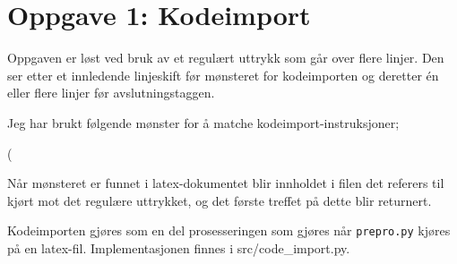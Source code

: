 \section*{Oppgave 1: Kodeimport}

Oppgaven er løst ved bruk av et regulært uttrykk som går over flere linjer. Den ser etter et innledende linjeskift før mønsteret for kodeimporten og deretter én eller flere linjer før avslutningstaggen.

Jeg har brukt følgende mønster for å matche kodeimport-instruksjoner;

\n(%

Når mønsteret er funnet i latex-dokumentet blir innholdet i filen det referers til kjørt mot det regulære uttrykket, og det første treffet på dette blir returnert.

Kodeimporten gjøres som en del prosesseringen som gjøres når \verb;prepro.py; kjøres på en latex-fil. Implementasjonen finnes i src/code\_import.py.